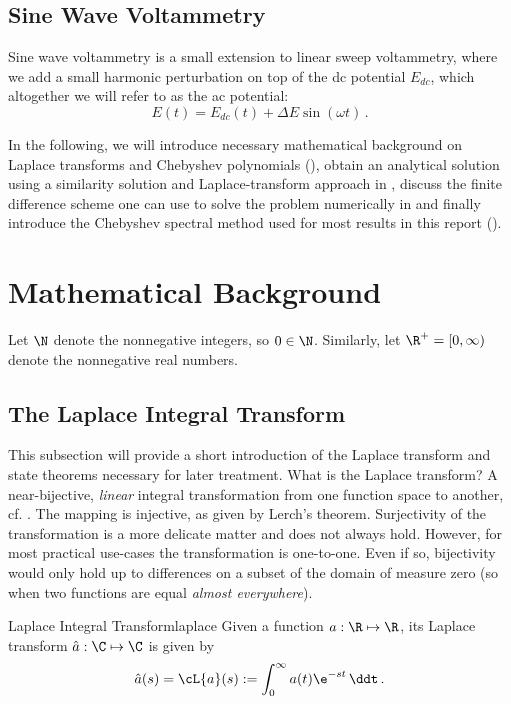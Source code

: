 \documentclass{prettytex/ox/mmsc-special-topic}
\begin{document}
  \subsection{Sine Wave Voltammetry}
  Sine wave voltammetry is a small extension to linear sweep voltammetry, where we add a small harmonic perturbation on top of the \gls{dc} potential $E_{dc}$, which altogether we will refer to as the \gls{ac} potential:
  \begin{equation}
    E(t) = E_{dc}(t) + \Delta E \sin(\omega t)\,.
    \label{eq:ac-potential}
  \end{equation}

  In the following, we will introduce necessary mathematical background on Laplace transforms and Chebyshev polynomials (), obtain an analytical solution using a similarity solution and Laplace-transform approach in , discuss the finite difference scheme one can use to solve the problem numerically in  and finally introduce the Chebyshev spectral method used for most results in this report ().

  \pagebreak
  \section{Mathematical Background}
  \label{sec:math-background}
  Let $\N$ denote the nonnegative integers, so $0 \in \N$.
  Similarly, let $\R^+ = [0, \infty)$ denote the nonnegative real numbers.

  \subsection{The Laplace Integral Transform}
  This subsection will provide a short introduction of the Laplace transform and state theorems necessary for later treatment. What is the Laplace transform?
  A near-bijective, \emph{linear} integral transformation from one function space to another, cf. .
  The mapping is injective, as given by Lerch's theorem. Surjectivity of the transformation is a more delicate matter and does not always hold.
  However, for most practical use-cases the transformation is one-to-one.
  Even if so, bijectivity would only hold up to differences on a subset of the domain of measure zero (so when two functions are equal \textit{almost everywhere}).

  \begin{definition}{Laplace Integral Transform}{laplace}
    Given a function $a: \R \mapsto \R$, its Laplace transform $\hat{a}: \C \mapsto \C$ is given by
    $$\hat{a}(s) = \cL\{a\}(s) := \int_{0}^{\infty} a(t) \e^{-st} \,\ddt\,.$$
  \end{definition}
\end{document}
